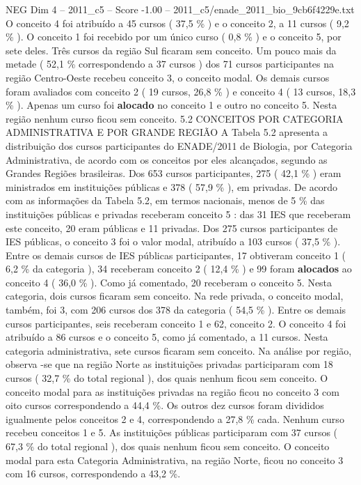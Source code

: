 \begin{textsample}{NEG Dim 4 – 2011\_c5 – Score -1.00 – 2011\_c5/enade\_2011\_bio\_9cb6f4229e.txt}
O conceito 4 foi atribuído a 45 cursos ( 37,5 \% ) e o conceito 2, a 11 cursos ( 9,2 \% ).
O conceito 1 foi recebido por um único curso ( 0,8 \% ) e o conceito 5, por sete deles.
Três cursos da região Sul ficaram sem conceito.
Um pouco mais da metade ( 52,1 \% correspondendo a 37 cursos ) dos 71 cursos participantes na região Centro-Oeste recebeu conceito 3, o conceito modal.
Os demais cursos foram avaliados com conceito 2 ( 19 cursos, 26,8 \% ) e conceito 4 ( 13 cursos, 18,3 \% ).
Apenas um curso foi \textbf{alocado} no conceito 1 e outro no conceito 5.
Nesta região nenhum curso ficou sem conceito. 5.2 CONCEITOS POR CATEGORIA ADMINISTRATIVA E POR GRANDE REGIÃO A Tabela 5.2 apresenta a distribuição dos cursos participantes do ENADE/2011 de Biologia, por Categoria Administrativa, de acordo com os conceitos por eles alcançados, segundo as Grandes Regiões brasileiras.
Dos 653 cursos participantes, 275 ( 42,1 \% ) eram ministrados em instituições públicas e 378 ( 57,9 \% ), em privadas.
De acordo com as informações da Tabela 5.2, em termos nacionais, menos de 5 \% das instituições públicas e privadas receberam conceito 5 : das 31 IES que receberam este conceito, 20 eram públicas e 11 privadas.
Dos 275 cursos participantes de IES públicas, o conceito 3 foi o valor modal, atribuído a 103 cursos ( 37,5 \% ).
Entre os demais cursos de IES públicas participantes, 17 obtiveram conceito 1 ( 6,2 \% da categoria ), 34 receberam conceito 2 ( 12,4 \% ) e 99 foram \textbf{alocados} ao conceito 4 ( 36,0 \% ).
Como já comentado, 20 receberam o conceito 5.
Nesta categoria, dois cursos ficaram sem conceito.
Na rede privada, o conceito modal, também, foi 3, com 206 cursos dos 378 da categoria ( 54,5 \% ).
Entre os demais cursos participantes, seis receberam conceito 1 e 62, conceito 2.
O conceito 4 foi atribuído a 86 cursos e o conceito 5, como já comentado, a 11 cursos.
Nesta categoria administrativa, sete cursos ficaram sem conceito.
Na análise por região, observa -se que na região Norte as instituições privadas participaram com 18 cursos ( 32,7 \% do total regional ), dos quais nenhum ficou sem conceito.
O conceito modal para as instituições privadas na região ficou no conceito 3 com oito cursos correspondendo a 44,4 \%.
Os outros dez cursos foram divididos igualmente pelos conceitos 2 e 4, correspondendo a 27,8 \% cada.
Nenhum curso recebeu conceitos 1 e 5.
As instituições públicas participaram com 37 cursos ( 67,3 \% do total regional ), dos quais nenhum ficou sem conceito.
O conceito modal para esta Categoria Administrativa, na região Norte, ficou no conceito 3 com 16 cursos, correspondendo a 43,2 \%.

\end{textsample}
